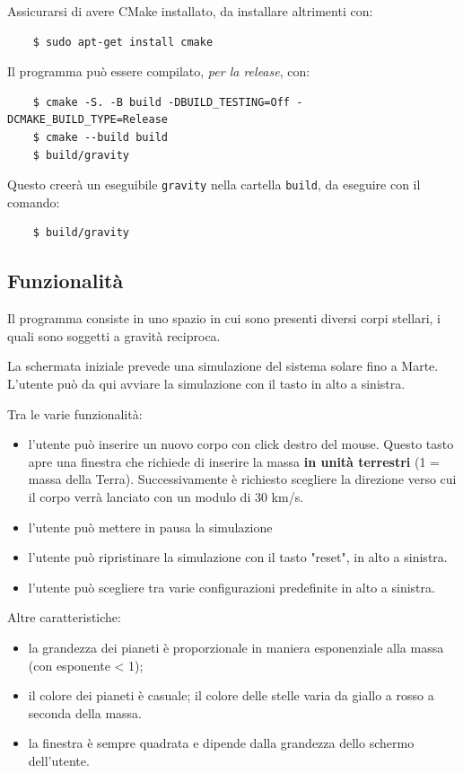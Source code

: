 \documentclass{article}
\begin{document}
Assicurarsi di avere CMake installato, da installare altrimenti con:
\begin{verbatim}
    $ sudo apt-get install cmake
\end{verbatim}

Il programma può essere compilato, \textit{per la release}, con:
\begin{verbatim}
    $ cmake -S. -B build -DBUILD_TESTING=Off -DCMAKE_BUILD_TYPE=Release
    $ cmake --build build
    $ build/gravity
     \end{verbatim}

Questo creerà un eseguibile \verb|gravity| nella cartella \verb|build|, da eseguire con il comando:
\begin{verbatim}
    $ build/gravity
\end{verbatim}

\subsection{Funzionalità}
Il programma consiste in uno spazio in cui sono presenti diversi corpi stellari, i quali sono soggetti a gravità reciproca.

La schermata iniziale prevede una simulazione del sistema solare fino a Marte. L'utente può da qui avviare la simulazione con il tasto in alto a sinistra. 

Tra le varie funzionalità:
\begin{itemize}
    \item l'utente può inserire un nuovo corpo con click destro del mouse. Questo tasto apre una finestra che richiede di inserire la massa \textbf{in unità terrestri} (1 = massa della Terra). Successivamente è richiesto scegliere la direzione verso cui il corpo verrà lanciato con un modulo di 30 km/s.
    \item l'utente può mettere in pausa la simulazione
    \item l'utente può ripristinare la simulazione con il tasto "reset", in alto a sinistra.
    \item l'utente può scegliere tra varie configurazioni predefinite in alto a sinistra.
\end{itemize}

Altre caratteristiche:
\begin{itemize}
    \item la grandezza dei pianeti è proporzionale in maniera esponenziale alla massa (con esponente < 1);
    \item il colore dei pianeti è casuale; il colore delle stelle varia da giallo a rosso a seconda della massa.
    \item la finestra è sempre quadrata e dipende dalla grandezza dello schermo dell'utente.
\end{itemize}
\end{document}
